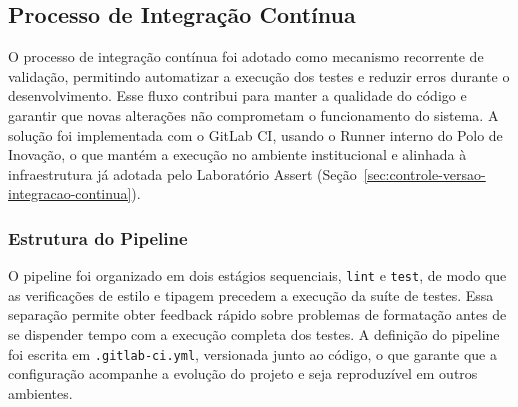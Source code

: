 
\subsection{Processo de Integração Contínua}

O processo de integração contínua foi adotado como mecanismo recorrente de validação,
permitindo automatizar a execução dos testes e reduzir erros durante o desenvolvimento.
Esse fluxo contribui para manter a qualidade do código e garantir que novas alterações
não comprometam o funcionamento do sistema. A solução foi implementada com o GitLab CI,
usando o Runner interno do Polo de Inovação, o que mantém a execução no ambiente
institucional e alinhada à infraestrutura já adotada pelo Laboratório Assert
(Seção~\ref{sec:controle-versao-integracao-continua}).

\subsubsection{Estrutura do Pipeline}

O pipeline foi organizado em dois estágios sequenciais, \texttt{lint} e \texttt{test},
de modo que as verificações de estilo e tipagem precedem a execução da suíte de testes.
Essa separação permite obter feedback rápido sobre problemas de formatação antes de se
dispender tempo com a execução completa dos testes. A definição do pipeline foi escrita
em \texttt{.gitlab-ci.yml}, versionada junto ao código, o que garante que a configuração
acompanhe a evolução do projeto e seja reproduzível em outros ambientes.


